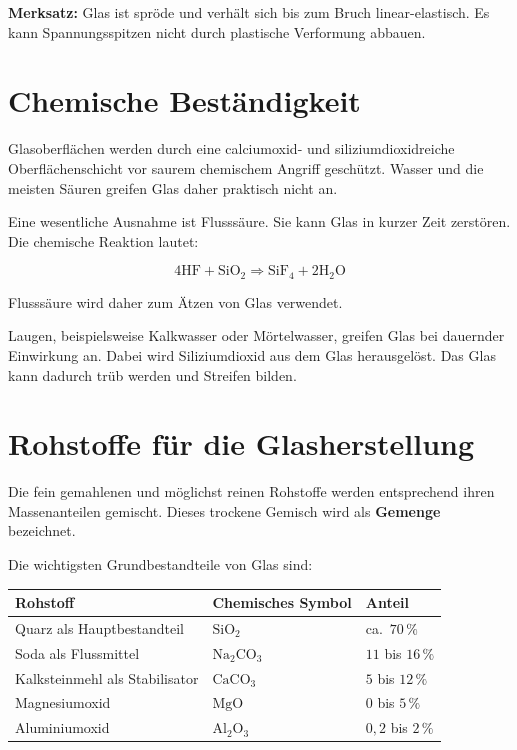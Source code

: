 \documentclass[
  12pt,
  a4paper,
  oneside
]{scrreprt}
\begin{document}
\begin{merksatzbox}
\textbf{Merksatz:}
Glas ist spröde und verhält sich bis zum Bruch linear-elastisch. Es
kann Spannungsspitzen nicht durch plastische Verformung abbauen.

\end{merksatzbox}

\section{Chemische Beständigkeit}

Glasoberflächen werden durch eine calciumoxid- und
siliziumdioxidreiche Oberflächenschicht vor saurem chemischem Angriff
geschützt. Wasser und die meisten Säuren greifen Glas daher praktisch
nicht an. 

Eine wesentliche Ausnahme ist Flusssäure. Sie kann Glas in kurzer Zeit
zerstören. Die chemische Reaktion lautet:

\begin{equation}
  \mathrm{
  4HF + SiO_2
  \Rightarrow
  SiF_4 + 2H_2O
  }
\end{equation}

Flusssäure wird daher zum Ätzen von Glas verwendet. 

Laugen, beispielsweise Kalkwasser oder Mörtelwasser, greifen Glas bei
dauernder Einwirkung an. Dabei wird Siliziumdioxid aus dem Glas
herausgelöst. Das Glas kann dadurch trüb werden und Streifen bilden.


\section{Rohstoffe für die Glasherstellung}

Die fein gemahlenen und möglichst reinen Rohstoffe werden entsprechend
ihren Massenanteilen gemischt. Dieses trockene Gemisch wird als
\textbf{Gemenge} bezeichnet. 

Die wichtigsten Grundbestandteile von Glas sind:

\begin{longtable}{
  >{\raggedright\arraybackslash}p{}
  >{\centering\arraybackslash}p{}
  >{\centering\arraybackslash}p{}
}
\toprule
\textbf{Rohstoff} &
\textbf{Chemisches Symbol} &
\textbf{Anteil} \\
\midrule
\endhead

Quarz als Hauptbestandteil &
$\mathrm{SiO_2}$ &
ca.\ $70\,\%$ \\

Soda als Flussmittel &
$\mathrm{Na_2CO_3}$ &
$11$ bis $16\,\%$ \\

Kalksteinmehl als Stabilisator &
$\mathrm{CaCO_3}$ &
$5$ bis $12\,\%$ \\

Magnesiumoxid &
$\mathrm{MgO}$ &
$0$ bis $5\,\%$ \\

Aluminiumoxid &
$\mathrm{Al_2O_3}$ &
$0{,}2$ bis $2\,\%$ \\

\bottomrule
\end{longtable}
\end{document}
